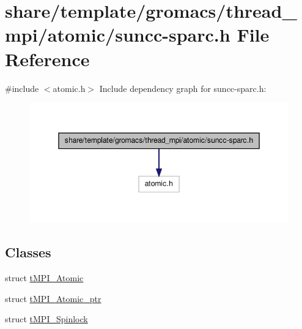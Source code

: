 \hypertarget{share_2template_2gromacs_2thread__mpi_2atomic_2suncc-sparc_8h}{\section{share/template/gromacs/thread\-\_\-mpi/atomic/suncc-\/sparc.h \-File \-Reference}
\label{share_2template_2gromacs_2thread__mpi_2atomic_2suncc-sparc_8h}
}
{\ttfamily \#include $<$atomic.\-h$>$}\*
\-Include dependency graph for suncc-\/sparc.h\-:
\nopagebreak
\begin{figure}[H]
\begin{center}
\leavevmode
\includegraphics[width=348pt]{share_2template_2gromacs_2thread__mpi_2atomic_2suncc-sparc_8h__incl}
\end{center}
\end{figure}
\subsection*{\-Classes}
\begin{DoxyCompactItemize}
\item 
struct \hyperlink{structtMPI__Atomic}{t\-M\-P\-I\-\_\-\-Atomic}
\item 
struct \hyperlink{structtMPI__Atomic__ptr}{t\-M\-P\-I\-\_\-\-Atomic\-\_\-ptr}
\item 
struct \hyperlink{structtMPI__Spinlock}{t\-M\-P\-I\-\_\-\-Spinlock}
\end{DoxyCompactItemize}
